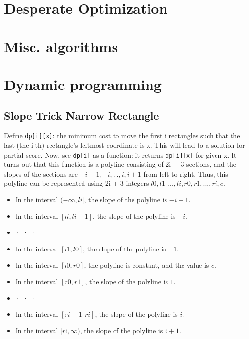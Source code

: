\section{Desperate Optimization}


\section{Misc. algorithms}

\section{Dynamic programming}

\subsection{Slope Trick Narrow Rectangle}
Define \texttt{dp[i][x]}: the minimum cost to move the first i rectangles such that the last (the i-th) rectangle’s
leftmost coordinate is x. This will lead to a solution for partial score.
Now, see \texttt{dp[i]} as a function: it returns \texttt{dp[i][x]} for given x. It turns out that this function is a polyline
consisting of 2i + 3 sections, and the slopes of the sections are $ -i - 1, -i, . . . , i, i + 1 $ from left to right.
Thus, this polyline can be represented using 2i + 3 integers $l0, l1, ..., li, r0, r1, ..., ri, c$.
\begin{itemize}
	\item In the interval $(-\infty, li]$, the slope of the polyline is $-i - 1$.
	\item In the interval $[li, li-1]$, the slope of the polyline is $-i$.
	\item · · ·
	\item In the interval $[l1, l0]$, the slope of the polyline is $-1$.
	\item In the interval $[l0, r0]$, the polyline is constant, and the value is $c$.
	\item In the interval $[r0, r1]$, the slope of the polyline is $1$.
	\item · · ·
	\item In the interval $[ri-1, ri]$, the slope of the polyline is $i$.
	\item In the interval $[ri,\infty)$, the slope of the polyline is $i + 1$.
\end{itemize}


